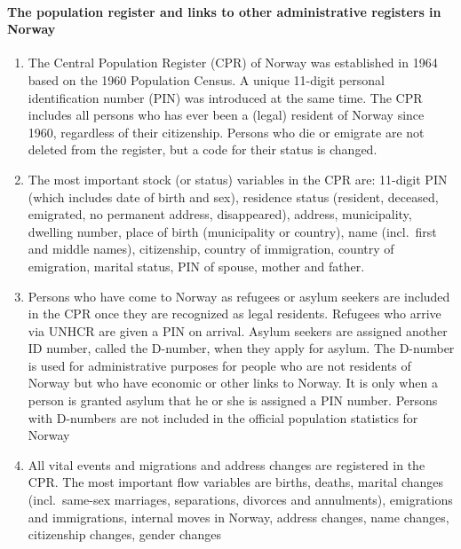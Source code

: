 \documentclass[
]{article}
\begin{document}
\hypertarget{the-population-register-and-links-to-other-administrative-registers-in-norway}{%
\paragraph{The population register and links to other administrative registers in Norway}\label{the-population-register-and-links-to-other-administrative-registers-in-norway}}

\begin{enumerate}
\def\labelenumi{\arabic{enumi}.}
\setcounter{enumi}{244}
\item
  The Central Population Register (CPR) of Norway was established in
  1964 based on the 1960 Population Census. A unique 11-digit personal
  identification number (PIN) was introduced at the same time. The CPR
  includes all persons who has ever been a (legal) resident of Norway
  since 1960, regardless of their citizenship. Persons who die or
  emigrate are not deleted from the register, but a code for their
  status is changed.
\item
  The most important stock (or status) variables in the CPR are:
  11-digit PIN (which includes date of birth and sex), residence
  status (resident, deceased, emigrated, no permanent address,
  disappeared), address, municipality, dwelling number, place of birth
  (municipality or country), name (incl.~first and middle names),
  citizenship, country of immigration, country of emigration, marital
  status, PIN of spouse, mother and father.
\item
  Persons who have come to Norway as refugees or asylum seekers are
  included in the CPR once they are recognized as legal residents.
  Refugees who arrive via UNHCR are given a PIN on arrival. Asylum
  seekers are assigned another ID number, called the D-number, when
  they apply for asylum. The D-number is used for administrative
  purposes for people who are not residents of Norway but who have
  economic or other links to Norway. It is only when a person is
  granted asylum that he or she is assigned a PIN number. Persons with
  D-numbers are not included in the official population statistics for
  Norway
\item
  All vital events and migrations and address changes are registered
  in the CPR. The most important flow variables are births, deaths,
  marital changes (incl.~same-sex marriages, separations, divorces and
  annulments), emigrations and immigrations, internal moves in Norway,
  address changes, name changes, citizenship changes, gender changes

\end{enumerate}
\end{document}
